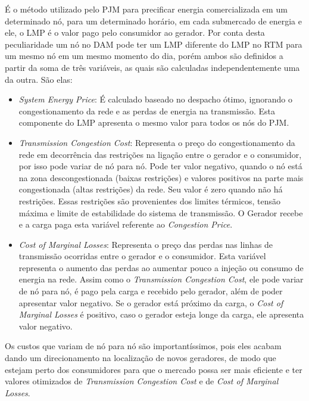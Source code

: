 É o método utilizado pelo PJM para precificar energia comercializada em um determinado nó, para um determinado horário, em cada submercado de energia e ele, o \ac{LMP} é o valor pago pelo consumidor ao gerador. Por conta desta peculiaridade um nó no \ac{DAM} pode ter um \ac{LMP} diferente do \ac{LMP} no \ac{RTM} para um mesmo nó em um mesmo momento do dia, porém ambos são definidos a partir da soma de três variáveis, as quais são calculadas independentemente uma da outra. São elas:
    \begin{itemize}
        \item \textit{System Energy Price}:
É calculado baseado no despacho ótimo, ignorando o congestionamento da rede e as perdas de energia na transmissão. 
Esta componente do \ac{LMP} apresenta o mesmo valor para todos os nós do PJM.

		\item \textit{Transmission Congestion Cost}:
		Representa o preço do congestionamento da rede em decorrência das restrições na ligação entre o gerador e o consumidor, por isso pode variar de nó para nó. Pode ter valor negativo, quando o nó está na zona descongestionada (baixas restrições) e valores positivos na parte mais congestionada (altas restrições) da rede. Seu valor é zero quando não há restrições. Essas restrições são provenientes dos limites térmicos, tensão máxima e limite de estabilidade do sistema de transmissão. O Gerador recebe e a carga paga esta variável referente ao \textit{Congestion Price}.

		\item \textit{Cost of Marginal Losses}:
		Representa o preço das perdas nas linhas de transmissão ocorridas entre o gerador e o consumidor. Esta variável representa o aumento das perdas ao aumentar pouco a injeção ou consumo de energia na rede. Assim como o \textit{Transmission Congestion Cost}, ele pode variar de nó para nó, é pago pela carga e recebido pelo gerador, além de poder apresentar valor negativo. Se o gerador está próximo da carga, o \textit{Cost of Marginal Losses} é positivo, caso o gerador esteja longe da carga, ele apresenta valor negativo.
    \end{itemize}

Os custos que variam de nó para nó são importantíssimos, pois eles acabam dando um direcionamento na localização de novos geradores, de modo que estejam perto dos consumidores para que o mercado possa ser mais eficiente e ter valores otimizados de \textit{Transmission Congestion Cost} e de \textit{Cost of Marginal Losses}.

